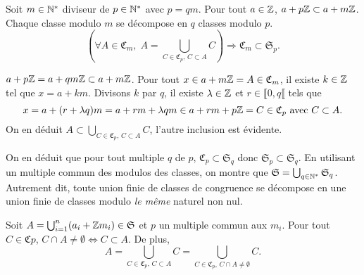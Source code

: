 \begin{propn} \label{décompoClasse}
 Soit $m\in \mathbb{N}^*$ diviseur de $p\in \mathbb{N}^*$ avec $p=qm$.\newline
 Pour tout $a\in \mathbb{Z}$, $a + p\mathbb{Z} \subset a + m\mathbb{Z}$. Chaque classe modulo $m$ se décompose en $q$ classes modulo $p$.
 \begin{displaymath}
  \left( \forall A\in \mathfrak{C}_m, \;  A = \bigcup_{C \in \mathfrak{C}_p,\, C\subset A} C \right) \Rightarrow \mathfrak{C}_m \subset \mathfrak{S}_p.
 \end{displaymath}
\end{propn}
\begin{demo}
 $a + p \mathbb{Z} = a + qm\mathbb{Z} \subset a + m\mathbb{Z}$. Pour tout $x \in  a + m\mathbb{Z} = A \in \mathfrak{C}_m$, il existe $k \in \mathbb{Z}$ tel que $x = a + km$. Divisons $k$ par $q$, il existe $\lambda \in \mathbb{Z}$ et $r \in \llbracket 0, q\llbracket$ tels que
 \begin{displaymath}
  x = a + (r+\lambda q)m = a+rm + \lambda qm \in a+rm + p \mathbb{Z} = C \in \mathfrak{C}_p \text{ avec } C \subset A.
 \end{displaymath}
 On en déduit $A \subset \bigcup_{C \in \mathfrak{C}_p,\, C\subset A} C$, l'autre inclusion est évidente.
\end{demo}
 \label{ExpleZ}
 \noindent On en déduit que pour tout multiple $q$ de $p$, $\mathfrak{C}_p \subset \mathfrak{S}_q$ donc $\mathfrak{S}_p \subset \mathfrak{S}_q$. En utilisant un multiple commun des modulos des classes, on montre que $\mathfrak{S}= \bigcup_{q \in \mathbb{N}^*}\mathfrak{S}_q$. Autrement dit, toute union finie de classes de congruence se décompose en une union finie de classes modulo \emph{le même} naturel non nul.
 \label{DecompUnionClasses}
 \begin{propn}
  Soit $A=\bigcup_{i=1}^n(a_i + \mathbb{Z} m_i) \in \mathfrak{S}$ et $p$ un multiple commun aux $m_i$.\newline
  Pour tout $C \in \mathfrak{C}p$, $C \cap A \neq \emptyset \Leftrightarrow C \subset A$. De plus,
  \begin{displaymath}
   A = \bigcup_{C \in \mathfrak{C}_p,\, C\subset A} C = \bigcup_{C \in \mathfrak{C}_p,\, C\cap A \neq \emptyset} C.
  \end{displaymath}
 \end{propn}
